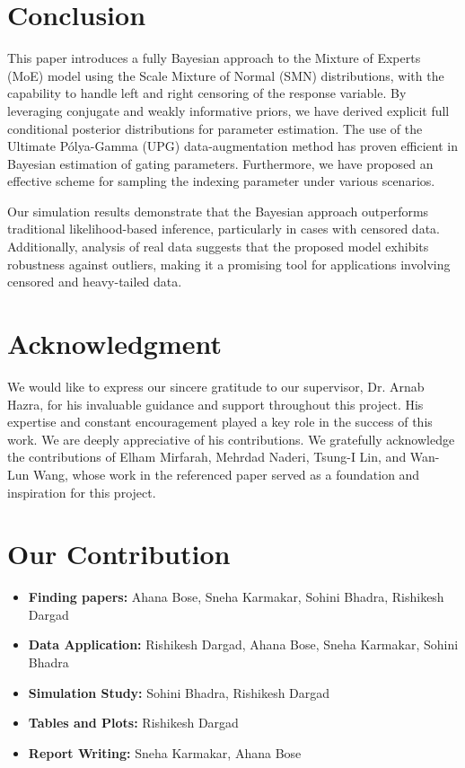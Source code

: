 \documentclass[10.5pt]{article} %
\begin{document}
\newpage

\section{Conclusion}

This paper introduces a fully Bayesian approach to the Mixture of Experts (MoE) model using the Scale Mixture of Normal (SMN) distributions, with the capability to handle left and right censoring of the response variable. By leveraging conjugate and weakly informative priors, we have derived explicit full conditional posterior distributions for parameter estimation. The use of the Ultimate Pólya-Gamma (UPG) data-augmentation method has proven efficient in Bayesian estimation of gating parameters. Furthermore, we have proposed an effective scheme for sampling the indexing parameter under various scenarios. 

\vspace{1em}

\noindent
Our simulation results demonstrate that the Bayesian approach outperforms traditional likelihood-based inference, particularly in cases with censored data. Additionally, analysis of real data suggests that the proposed model exhibits robustness against outliers, making it a promising tool for applications involving censored and heavy-tailed data.
\section{Acknowledgment}
We would like to express our sincere gratitude to our supervisor, Dr. Arnab Hazra, for his invaluable guidance and support throughout this project. His expertise and constant encouragement played a key role in the success of this work. We are deeply appreciative of his contributions. We gratefully acknowledge the contributions of Elham Mirfarah, Mehrdad Naderi, Tsung-I Lin, and Wan-Lun Wang, whose work in the referenced paper served as a foundation and inspiration for this project.

\section{Our Contribution}
\begin{itemize}
    \item \textbf{Finding papers:} Ahana Bose, Sneha Karmakar, Sohini Bhadra, Rishikesh Dargad
    \item \textbf{Data Application:} Rishikesh Dargad, Ahana Bose, Sneha Karmakar, Sohini Bhadra
    \item \textbf{Simulation Study:} Sohini Bhadra, Rishikesh Dargad
    \item \textbf{Tables and Plots:} Rishikesh Dargad
    \item \textbf{Report Writing:} Sneha Karmakar, Ahana Bose
\end{itemize}
\end{document}
